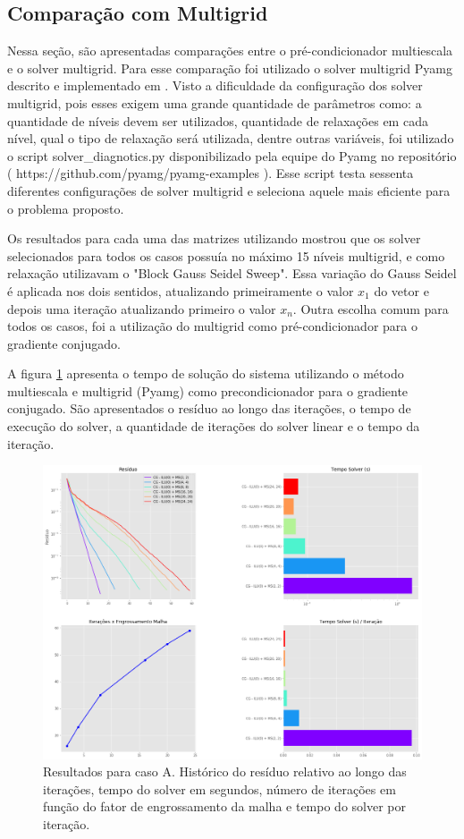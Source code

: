 \subsection{Comparação com Multigrid}

Nessa seção, são apresentadas comparações entre o pré-condicionador multiescala e o solver multigrid. Para esse comparação foi utilizado o solver multigrid Pyamg descrito e implementado em \cite{OlSc2018} . Visto a dificuldade da configuração dos solver multigrid, pois esses exigem uma grande quantidade de parâmetros como: a quantidade de níveis devem ser utilizados, quantidade de relaxações em cada nível, qual o tipo de relaxação será utilizada, dentre outras variáveis, foi utilizado o script solver\_diagnotics.py disponibilizado pela equipe do Pyamg no repositório ( https://github.com/pyamg/pyamg-examples ). Esse script testa sessenta diferentes configurações de solver multigrid e seleciona aquele mais eficiente para o problema proposto.

Os resultados para cada uma das matrizes utilizando mostrou que os solver selecionados para todos os casos possuía no máximo 15 níveis multigrid, e como relaxação utilizavam o "Block Gauss Seidel Sweep". Essa variação do Gauss Seidel é aplicada nos dois sentidos, atualizando primeiramente o valor  $x_1$  do vetor e depois uma iteração atualizando primeiro o valor  $x_n$. Outra escolha comum para todos os casos, foi a utilização do multigrid como pré-condicionador para o gradiente conjugado.


A figura \ref{fig:reservatorio100x100_1} apresenta o tempo de solução do sistema utilizando o método multiescala e multigrid (Pyamg) como precondicionador para o gradiente conjugado. São apresentados o resíduo ao longo das iterações, o tempo de execução do solver, a quantidade de iterações do solver linear e o tempo da iteração.

\begin{figure}[!htbp]
\label{fig:reservatorio100x100_1}
\centering
\includegraphics[width=\textwidth]{chap08/figs/reservatorio100x100_1.png}
\caption{Resultados para caso A. Histórico do resíduo relativo ao longo das iterações, tempo do solver em segundos, número de iterações em função do fator de engrossamento da malha e tempo do solver por iteração. }
\end{figure}


